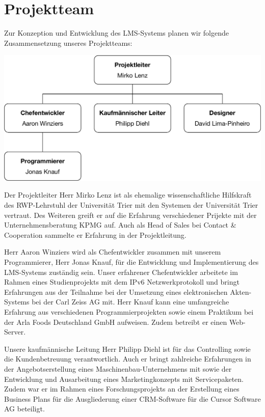 \documentclass[10pt,a4paper]{article}
\begin{document}
\section{Projektteam}
Zur Konzeption und Entwicklung des LMS-Systems planen wir folgende Zusammensetzung unseres Projektteams:

\begin{center}
	\includegraphics[scale=.4]{Gruppeneinteilung.pdf}
\end{center}

Der Projektleiter Herr Mirko Lenz ist als ehemalige wissenschaftliche Hilfskraft des RWP-Lehrstuhl der Universität Trier mit den Systemen der Universität Trier vertraut. Des Weiteren greift er auf die Erfahrung verschiedener Prijekte mit der Unternehmensberatung KPMG auf. Auch als Head of Sales bei Contact \& Cooperation sammelte er Erfahrung in der Projektleitung.

Herr Aaron Winziers wird als Chefentwickler zusammen mit unserem Programmierer, Herr Jonas Knauf, für die Entwicklung und Implementierung des LMS-Systems zuständig sein. Unser erfahrener Chefentwickler arbeitete im Rahmen eines Studienprojekts mit dem IPv6 Netzwerkprotokoll und bringt Erfahrungen aus der Teilnahme bei der Umsetzung eines elektronischen Akten-Systems bei der Carl Zeiss AG mit. Herr Knauf kann eine umfangreiche Erfahrung aus verschiedenen Programmierprojekten sowie einem Praktikum bei der Arla Foods Deutschland GmbH aufweisen. Zudem betreibt er einen Web-Server.

Unsere kaufmännische Leitung Herr Philipp Diehl ist für das Controlling sowie die Kundenbetreuung verantwortlich. Auch er bringt zahlreiche Erfahrungen in der Angebotserstellung eines Maschinenbau-Unternehmens mit sowie der Entwicklung und Ausarbeitung eines Marketingkonzepts mit Servicepaketen. Zudem war er im Rahmen eines Forschungsprojekts an der Erstellung eines Business Plans für die Ausgliederung einer CRM-Software für die Cursor Software AG beteiligt.
\end{document}
